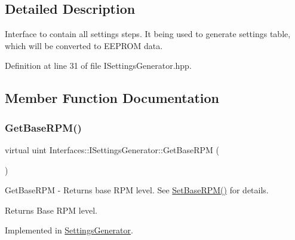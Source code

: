 \subsection{Detailed Description}
Interface to contain all settings steps. It being used to generate settings table, which will be converted to E\+E\+P\+R\+OM data. 

Definition at line 31 of file I\+Settings\+Generator.\+hpp.



\subsection{Member Function Documentation}
\mbox{\label{class_interfaces_1_1_i_settings_generator_ad088253da57b2ee0b94fe6fd1fb2dfdd}} 
\subsubsection{\texorpdfstring{Get\+Base\+R\+P\+M()}{GetBaseRPM()}}
{\footnotesize\ttfamily virtual uint Interfaces\+::\+I\+Settings\+Generator\+::\+Get\+Base\+R\+PM (\begin{DoxyParamCaption}{ }\end{DoxyParamCaption})\hspace{0.3cm}{\ttfamily [pure virtual]}}



Get\+Base\+R\+PM -\/ Returns base R\+PM level. See \hyperlink{class_interfaces_1_1_i_settings_generator_a4caf07447d0930440d9f21318892244c}{Set\+Base\+R\+P\+M()} for details. 

\begin{DoxyReturn}{Returns}
Base R\+PM level. 
\end{DoxyReturn}


Implemented in \hyperlink{class_settings_generator_a99bbe6e67e638ccc7bf6b21b3bc36135}{Settings\+Generator}.

\mbox{\label{class_interfaces_1_1_i_settings_generator_a9cc36185b446f21e09a0e5633f39a1c5}} 

